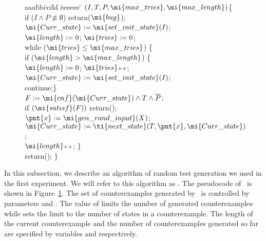 \setlength{\intextsep}{10pt}
\setlength{\textfloatsep}{10pt}
\begin{figure}
\small
\begin{tabbing}
aaa\=bb\=cc\= dd \= eeeeee \= \kill
\Rnd$(I,T,P,\mi{max\_tries},\mi{max\_length})$\{\\
\> if ($I \wedge \overline{P} \not\equiv \emptyset$) return($\mi{bug}$); \\
\> $\mi{Curr\_state} :=  \mi{set\_init\_state}(I)$; \\
 \> $\mi{length} := 0$; $\mi{tries} := 0$; \\
 \> while ($\mi{tries} \leq \mi{max\_tries}$) \{\\
 \Tt if ($\mi{length} > \mi{max\_length}$) \{ \\
 \ttt  $\mi{length} := 0$; $\mi{tries}\scriptstyle{++}$; \\
 \ttt $\mi{Curr\_state} := \mi{set\_init\_state}(I)$; \\
 \ttt continue;\} \\
\Tt$F := \mi{cnf}(\mi{Curr\_state}) \wedge T \wedge \overline{P}$;\\
 \Tt if $(\mi{satisf}(F))$ return(); \\
 \Tt $\pnt{x} := \mi{gen\_rand\_input}(X)$; \\
\Tt $\mi{Curr\_state} := \ti{next\_state}(T,\pnt{x},\mi{Curr\_state})$; \\
\Tt $\mi{length}\scriptstyle{++}$; \} \\
 \> return(); \} \\
\end{tabbing} 
\vspace{-10pt}
\caption{}
\label{fig:rand_alg}
\end{figure}
 In this  subsection, we describe an algorithm of random test generation we used in the first experiment.
We will refer to this algorithm as \Rnd. 
The pseudocode of \Rnd~is shown in Figure~\ref{fig:rand_alg}.
The set of counterexamples generated by \Rnd~is controlled
by parameters  and . The value of  limits the number
of generated  counterexamples while  sets the limit to the number of states
in a counterexample. The length of the current counterexample and the number of counterexamples 
generated so far are specified by variables  and  respectively.

